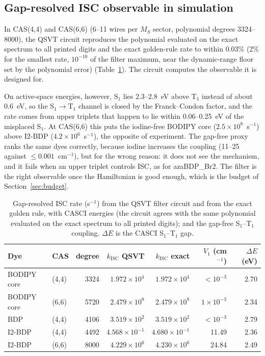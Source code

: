 \documentclass[journal=jctcce,manuscript=article,layout=twocolumn]{achemso}
\newcommand{\kisc}{k_\mathrm{ISC}}
\begin{document}
\subsection{Gap-resolved ISC observable in simulation}
\label{sec:filter}

In CAS(4,4) and CAS(6,6) (6--11 wires per $M_S$ sector, polynomial degrees
3324--8000), the QSVT circuit reproduces the polynomial evaluated on the exact spectrum to all printed
digits and the exact golden-rule rate to within 0.03\% (2\% for the smallest rate, $10^{-10}$ of the
filter maximum, near the dynamic-range floor set by the polynomial error) (Table~\ref{tab:filter}). The
circuit computes the observable it is designed for.

On active-space energies, however, S$_1$ lies
2.3--2.8~eV above T$_1$ instead of about 0.6~eV, so the S$_1\to$T$_1$ channel is closed by the
Franck--Condon factor, and the rate comes from upper triplets that happen to lie within 0.06--0.25~eV
of the misplaced S$_1$. At CAS(6,6) this puts the iodine-free BODIPY core ($2.5\times10^{8}$~s$^{-1}$)
above I2-BDP ($4.2\times10^{6}$~s$^{-1}$), the opposite of experiment. The gap-free proxy ranks the same
dyes correctly, because iodine increases the coupling (11--25 against $\le0.001$~cm$^{-1}$), but for the
wrong reason: it does not see the mechanism, and it fails when an upper triplet controls ISC, as for
azaBDP\_Br2. The filter is the right observable once the Hamiltonian is good enough, which is the
budget of Section~\ref{sec:budget}.

\begin{table}
  \caption{Gap-resolved ISC rate (s$^{-1}$) from the QSVT filter circuit and from the exact golden rule,
  with CASCI energies (the circuit agrees with the same polynomial evaluated on the exact spectrum to all
  printed digits); and the gap-free S$_1$--T$_1$ coupling. $\Delta E$ is the CASCI S$_1$--T$_1$ gap.}
  \label{tab:filter}
  \begin{tabular}{llrrrrr}
    \toprule
    Dye & CAS & degree & $\kisc$ QSVT & $\kisc$ exact & $V_1$ (cm$^{-1}$) & $\Delta E$ (eV) \\
    \midrule
    BODIPY core & (4,4) & 3324 & $1.972\times10^{4}$ & $1.972\times10^{4}$ & $<10^{-3}$ & 2.70 \\
    BODIPY core & (6,6) & 5720 & $2.479\times10^{8}$ & $2.479\times10^{8}$ & $1\times10^{-3}$ & 2.34 \\
    BDP         & (4,4) & 4106 & $3.519\times10^{2}$ & $3.519\times10^{2}$ & $<10^{-3}$ & 2.79 \\
    I2-BDP      & (4,4) & 4492 & $4.568\times10^{-1}$ & $4.680\times10^{-1}$ & 11.49 & 2.36 \\
    I2-BDP      & (6,6) & 8000 & $4.229\times10^{6}$ & $4.230\times10^{6}$ & 24.84 & 2.49 \\
    \bottomrule
  \end{tabular}
\end{table}
\end{document}
